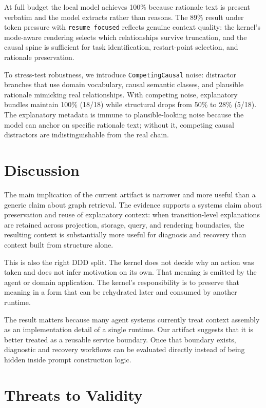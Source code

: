 \documentclass[11pt]{article}
\begin{document}
At full budget the local model achieves 100\% because rationale text is
present verbatim and the model extracts rather than reasons. The 89\% result
under token pressure with \texttt{resume\_focused} reflects genuine context
quality: the kernel's mode-aware rendering selects which relationships
survive truncation, and the causal spine is sufficient for task identification,
restart-point selection, and rationale preservation.

To stress-test robustness, we introduce \texttt{CompetingCausal} noise:
distractor branches that use domain vocabulary, causal semantic classes, and
plausible rationale mimicking real relationships. With competing noise,
explanatory bundles maintain 100\% (18/18) while structural drops from 50\%
to 28\% (5/18). The explanatory metadata is immune to plausible-looking
noise because the model can anchor on specific rationale text; without it,
competing causal distractors are indistinguishable from the real chain.

\section{Discussion}

The main implication of the current artifact is narrower and more useful than a
generic claim about graph retrieval. The evidence supports a systems claim
about preservation and reuse of explanatory context: when transition-level
explanations are retained across projection, storage, query, and rendering
boundaries, the resulting context is substantially more useful for diagnosis
and recovery than context built from structure alone.

This is also the right DDD split. The kernel does not decide why an action was
taken and does not infer motivation on its own. That meaning is emitted by the
agent or domain application. The kernel's responsibility is to preserve that
meaning in a form that can be rehydrated later and consumed by another runtime.

The result matters because many agent systems currently treat context assembly
as an implementation detail of a single runtime. Our artifact suggests that it
is better treated as a reusable service boundary. Once that boundary exists,
diagnostic and recovery workflows can be evaluated directly instead of being
hidden inside prompt construction logic.

\section{Threats to Validity}
\end{document}
